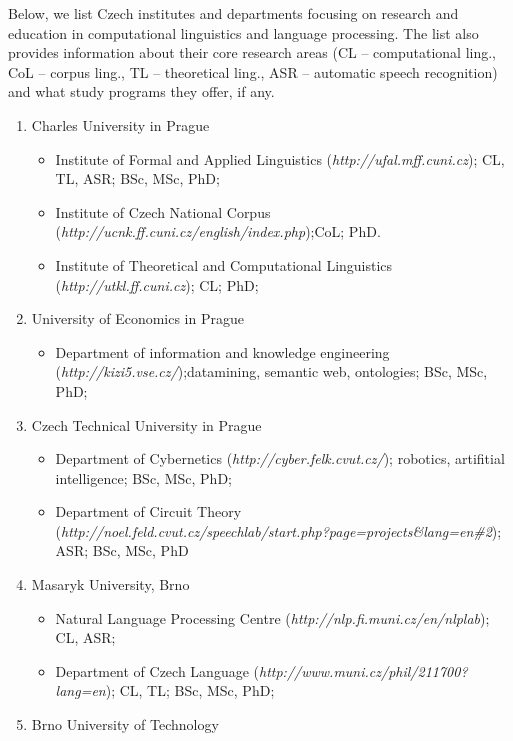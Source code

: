 \begin{multicols}{2}
Below, we list Czech institutes and departments focusing on research and education in computational linguistics and language processing. The list also provides information about their core research areas (CL – computational ling., CoL – corpus ling., TL – theoretical ling., ASR – automatic speech recognition) and what study programs they offer, if any.

\begin{enumerate}
\item Charles University in Prague
  \begin{itemize}
  \item Institute of Formal and Applied Linguistics (\textit{http://ufal.mff.cuni.cz}); CL, TL, ASR; BSc, MSc, PhD;
  \item Institute of Czech National Corpus (\textit{http://ucnk.ff.cuni.cz/english/index.php});CoL; PhD.
  \item Institute of Theoretical and Computational Linguistics (\textit{http://utkl.ff.cuni.cz}); CL; PhD;
  \end{itemize}
\item University of Economics in Prague
  \begin{itemize}
  \item Department of information and knowledge engineering (\textit{http://kizi5.vse.cz/});datamining, semantic web, ontologies; BSc, MSc, PhD;
  \end{itemize}
\item Czech Technical University in Prague
  \begin{itemize}
  \item Department of Cybernetics (\textit{http://cyber.felk.cvut.cz/}); robotics, artifitial   intelligence; BSc, MSc, PhD;
  \item Department of Circuit Theory (\textit{http://noel.feld.cvut.cz/speechlab/start.php?page=projects\&lang=en\#2});  ASR; BSc, MSc, PhD
  \end{itemize}
\item Masaryk University, Brno
  \begin{itemize}
  \item Natural Language Processing Centre (\textit{http://nlp.fi.muni.cz/en/nlplab}); CL, ASR; 
  \item Department of Czech Language (\textit{http://www.muni.cz/phil/211700?lang=en}); CL, TL;	BSc, MSc, PhD;
  \end{itemize}
\item Brno University of Technology
  \begin{itemize}

\end{itemize}
\end{enumerate}
\end{multicols}
